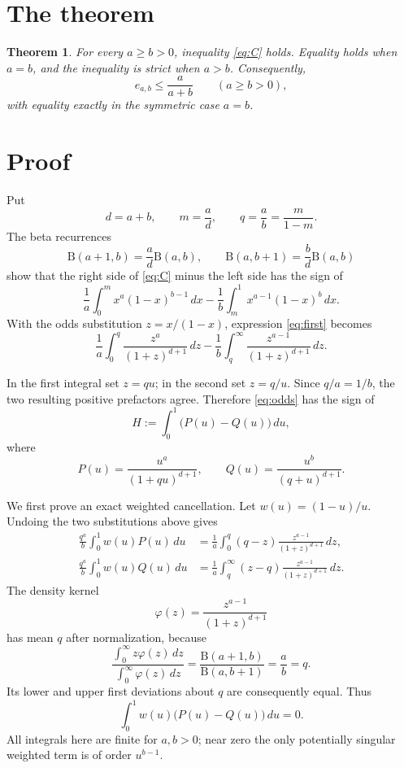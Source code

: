 \documentclass[11pt]{article}
\newtheorem{theorem}{Theorem}
\newcommand{\B}{\mathrm B}
\begin{document}
\section{The theorem}

\begin{theorem}\label{thm:main}
For every $a\geq b>0$, inequality \eqref{eq:C} holds. Equality holds when
$a=b$, and the inequality is strict when $a>b$. Consequently,
\[
  e_{a,b}\leq \frac{a}{a+b}
  \qquad(a\geq b>0),
\]
with equality exactly in the symmetric case $a=b$.
\end{theorem}

\section{Proof}

Put
\[
 d=a+b,\qquad m=\frac ad,
 \qquad q=\frac ab=\frac{m}{1-m}.
\]
The beta recurrences
\[
 \B(a+1,b)=\frac ad\B(a,b),\qquad
 \B(a,b+1)=\frac bd\B(a,b)
\]
show that the right side of \eqref{eq:C} minus the left side has the sign of
\begin{equation}
 \frac1a\int_0^m x^a(1-x)^{b-1}\,dx
 -\frac1b\int_m^1x^{a-1}(1-x)^b\,dx.
 \label{eq:first}
\end{equation}
With the odds substitution $z=x/(1-x)$, expression \eqref{eq:first} becomes
\begin{equation}
 \frac1a\int_0^q\frac{z^a}{(1+z)^{d+1}}\,dz
 -\frac1b\int_q^\infty\frac{z^{a-1}}{(1+z)^{d+1}}\,dz.
 \label{eq:odds}
\end{equation}

In the first integral set $z=qu$; in the second set $z=q/u$. Since
$q/a=1/b$, the two resulting positive prefactors agree. Therefore
\eqref{eq:odds} has the sign of
\begin{equation}
 H:=\int_0^1\bigl(P(u)-Q(u)\bigr)\,du,
 \label{eq:H}
\end{equation}
where
\begin{equation}
 P(u)=\frac{u^a}{(1+qu)^{d+1}},
 \qquad
 Q(u)=\frac{u^b}{(q+u)^{d+1}}.
 \label{eq:PQ}
\end{equation}

We first prove an exact weighted cancellation. Let
$w(u)=(1-u)/u$. Undoing the two substitutions above gives
\begin{align*}
 \frac{q^a}{b}\int_0^1w(u)P(u)\,du
 &=\frac1a\int_0^q(q-z)\frac{z^{a-1}}{(1+z)^{d+1}}\,dz,\\
 \frac{q^a}{b}\int_0^1w(u)Q(u)\,du
 &=\frac1a\int_q^\infty(z-q)\frac{z^{a-1}}{(1+z)^{d+1}}\,dz.
\end{align*}
The density kernel
\[
 \varphi(z)=\frac{z^{a-1}}{(1+z)^{d+1}}
\]
has mean $q$ after normalization, because
\[
 \frac{\int_0^\infty z\varphi(z)\,dz}
      {\int_0^\infty \varphi(z)\,dz}
 =\frac{\B(a+1,b)}{\B(a,b+1)}=\frac ab=q.
\]
Its lower and upper first deviations about $q$ are consequently equal.
Thus
\begin{equation}
 \int_0^1 w(u)\bigl(P(u)-Q(u)\bigr)\,du=0.
 \label{eq:weightedzero}
\end{equation}
All integrals here are finite for $a,b>0$; near zero the only potentially
singular weighted term is of order $u^{b-1}$.
\end{document}
